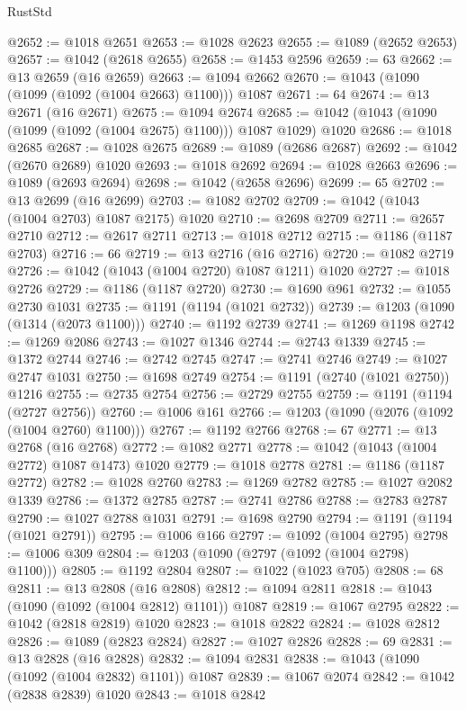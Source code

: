 \begin{lexlean}{RustStd}
\begin{coremodule}
@2652 := @1018 @2651
@2653 := @1028 @2623
@2655 := @1089 (@2652 @2653)
@2657 := @1042 (@2618 @2655)
@2658 := @1453 @2596
@2659 := 63
@2662 := @13 @2659 (@16 @2659)
@2663 := @1094 @2662
@2670 := @1043 (@1090 (@1099 (@1092 (@1004 @2663) @1100))) @1087
@2671 := 64
@2674 := @13 @2671 (@16 @2671)
@2675 := @1094 @2674
@2685 := @1042 (@1043 (@1090 (@1099 (@1092 (@1004 @2675) @1100))) @1087 @1029) @1020
@2686 := @1018 @2685
@2687 := @1028 @2675
@2689 := @1089 (@2686 @2687)
@2692 := @1042 (@2670 @2689) @1020
@2693 := @1018 @2692
@2694 := @1028 @2663
@2696 := @1089 (@2693 @2694)
@2698 := @1042 (@2658 @2696)
@2699 := 65
@2702 := @13 @2699 (@16 @2699)
@2703 := @1082 @2702
@2709 := @1042 (@1043 (@1004 @2703) @1087 @2175) @1020
@2710 := @2698 @2709
@2711 := @2657 @2710
@2712 := @2617 @2711
@2713 := @1018 @2712
@2715 := @1186 (@1187 @2703)
@2716 := 66
@2719 := @13 @2716 (@16 @2716)
@2720 := @1082 @2719
@2726 := @1042 (@1043 (@1004 @2720) @1087 @1211) @1020
@2727 := @1018 @2726
@2729 := @1186 (@1187 @2720)
@2730 := @1690 @961
@2732 := @1055 @2730 @1031
@2735 := @1191 (@1194 (@1021 @2732))
@2739 := @1203 (@1090 (@1314 (@2073 @1100)))
@2740 := @1192 @2739
@2741 := @1269 @1198
@2742 := @1269 @2086
@2743 := @1027 @1346
@2744 := @2743 @1339
@2745 := @1372 @2744
@2746 := @2742 @2745
@2747 := @2741 @2746
@2749 := @1027 @2747 @1031
@2750 := @1698 @2749
@2754 := @1191 (@2740 (@1021 @2750)) @1216
@2755 := @2735 @2754
@2756 := @2729 @2755
@2759 := @1191 (@1194 (@2727 @2756))
@2760 := @1006 @161
@2766 := @1203 (@1090 (@2076 (@1092 (@1004 @2760) @1100)))
@2767 := @1192 @2766
@2768 := 67
@2771 := @13 @2768 (@16 @2768)
@2772 := @1082 @2771
@2778 := @1042 (@1043 (@1004 @2772) @1087 @1473) @1020
@2779 := @1018 @2778
@2781 := @1186 (@1187 @2772)
@2782 := @1028 @2760
@2783 := @1269 @2782
@2785 := @1027 @2082 @1339
@2786 := @1372 @2785
@2787 := @2741 @2786
@2788 := @2783 @2787
@2790 := @1027 @2788 @1031
@2791 := @1698 @2790
@2794 := @1191 (@1194 (@1021 @2791))
@2795 := @1006 @166
@2797 := @1092 (@1004 @2795)
@2798 := @1006 @309
@2804 := @1203 (@1090 (@2797 (@1092 (@1004 @2798) @1100)))
@2805 := @1192 @2804
@2807 := @1022 (@1023 @705)
@2808 := 68
@2811 := @13 @2808 (@16 @2808)
@2812 := @1094 @2811
@2818 := @1043 (@1090 (@1092 (@1004 @2812) @1101)) @1087
@2819 := @1067 @2795
@2822 := @1042 (@2818 @2819) @1020
@2823 := @1018 @2822
@2824 := @1028 @2812
@2826 := @1089 (@2823 @2824)
@2827 := @1027 @2826
@2828 := 69
@2831 := @13 @2828 (@16 @2828)
@2832 := @1094 @2831
@2838 := @1043 (@1090 (@1092 (@1004 @2832) @1101)) @1087
@2839 := @1067 @2074
@2842 := @1042 (@2838 @2839) @1020
@2843 := @1018 @2842

\end{coremodule}
\end{lexlean}
